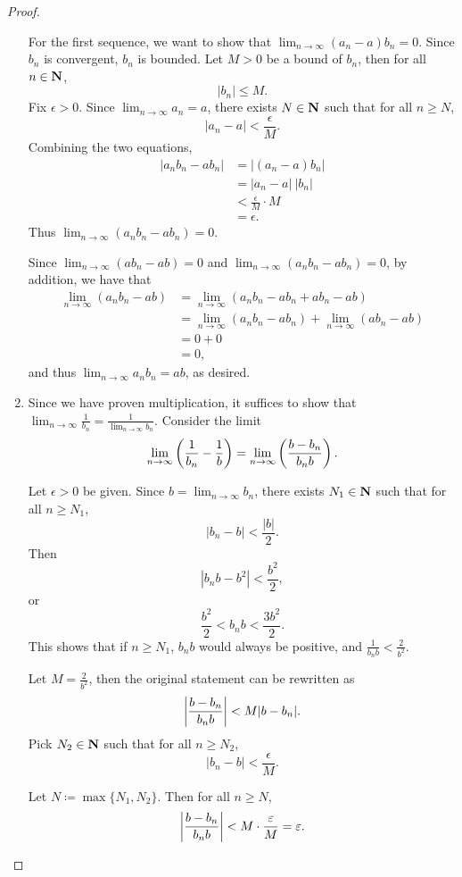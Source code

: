 \begin{proof}
\begin{enumerate}[label=(\roman*)]
For the first sequence, we want to show that $\displaystyle\lim_{n\to\infty}(a_n-a)b_n=0$. Since $b_n$ is convergent, $b_n$ is bounded. Let $M>0$ be a bound of $b_n$, then for all $n\in\mathbf N$,
\[|b_n|\le M.\]
Fix $\epsilon>0$. Since $\displaystyle\lim_{n\to\infty}a_n=a$, there exists $N\in\mathbf N$ such that for all $n\ge N$,
\[|a_n-a|<\frac{\epsilon}{M}.\]
Combining the two equations,
\begin{align*}
|a_nb_n-ab_n|
&=|(a_n-a)b_n|\\
&=|a_n-a|\:|b_n|\\
&<\frac{\epsilon}{M}\cdot M\\
&=\epsilon.
\end{align*}
Thus $\displaystyle\lim_{n\to\infty}(a_nb_n-ab_n)=0$.

Since $\displaystyle\lim_{n\to\infty}(ab_n-ab)=0$ and $\displaystyle\lim_{n\to\infty}(a_nb_n-ab_n)=0$, by addition, we have that
\begin{align*}
\lim_{n\to\infty}(a_nb_n-ab)
&=\lim_{n\to\infty}(a_nb_n-ab_n+ab_n-ab)\\
&=\lim_{n\to\infty}(a_nb_n-ab_n)+\lim_{n\to\infty}(ab_n-ab)\\
&=0+0\\
&=0,
\end{align*}
and thus $\displaystyle\lim_{n\to\infty}a_nb_n=ab$, as desired.

\item Since we have proven multiplication, it suffices to show that $\displaystyle\lim_{n\to\infty}\frac{1}{b_n}=\frac{1}{\lim_{n\to\infty} b_n}$. Consider the limit
\[\lim_{n\to\infty}\left(\frac{1}{b_n}-\frac{1}{b}\right)=\lim_{n\to\infty}\left(\frac{b-b_n}{b_nb}\right). \]

Let $\epsilon>0$ be given. Since $\displaystyle b=\lim_{n\to\infty}b_n$, there exists $N_1\in\mathbf N$ such that for all $n\ge N_1$,
\[|b_n-b|<\frac{|b|}{2}.\]
Then
\[|b_nb-b^2|<\frac{b^2}{2},\]
or
\[\frac{b^2}{2}<b_nb<\frac{3b^2}{2}.\]
This shows that if $n\ge N_1$, $b_nb$ would always be positive, and $\frac{1}{b_nb}<\frac{2}{b^2}$.

Let $M=\frac{2}{b^2}$, then the original statement can be rewritten as
\[\left|\frac{b-b_n}{b_nb}\right|<M|b-b_n|.\]
Pick $N_2\in\mathbf N$ such that for all $n\ge N_2$,
\[|b_n-b|<\frac{\epsilon}{M}.\]

Let $N\coloneqq\max\{N_1,N_2\}$. Then for all $n\ge N$,
\[ \left|\frac{b-b_n}{b_nb}\right|<M\cdot\frac{\varepsilon}{M}=\varepsilon. \]
\end{enumerate}
\end{proof}

